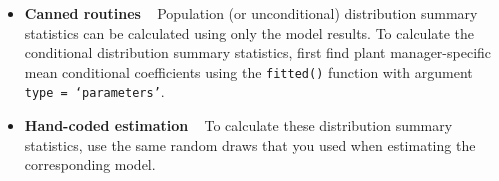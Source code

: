 \documentclass[11pt,letterpaper]{article}
\begin{document}
\begin{itemize}[label={}, leftmargin=*]
	\item \textbf{Canned routines} ~ Population (or unconditional) distribution summary statistics can be calculated using only the model results. To calculate the conditional distribution summary statistics, first find plant manager-specific mean conditional coefficients using the \texttt{fitted()} function with argument \texttt{type = `parameters'}.
	\item \textbf{Hand-coded estimation} ~ To calculate these distribution summary statistics, use the same random draws that you used when estimating the corresponding model.
\end{itemize}
\end{document}
